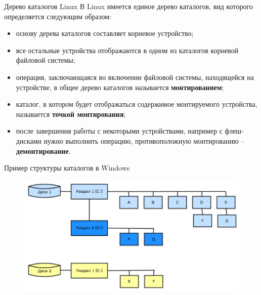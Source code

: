 \documentclass[xcolor=table]{beamer}
\begin{document}
\begin{frame}[fragile]{Дерево каталогов Linux}
	В Linux имеется единое дерево каталогов, вид которого определяется следующим образом:
	\begin{itemize}
		\item основу дерева каталогов составляет корневое устройство;
		\item все остальные устройства отображаются в одном из каталогов корневой файловой системы;
		\item операция, заключающаяся во включении файловой системы, находящейся на устройстве, в общее дерево каталогов называется \textbf{монтированием};
		\item каталог, в котором будет отображаться содержимое монтируемого устройства, называется \textbf{точкой
монтирования}; 
		\item после завершения работы с некоторыми устройствами, например с флеш-дисками нужно выполнить операцию, противоположную монтированию – \textbf{демонтирование}.
	\end{itemize}
\end{frame}

\begin{frame}[fragile]{Пример структуры каталогов в Windows}
	\begin{figure}[h]
		\centering
		\includegraphics[scale=0.5]{images/lec09-pic01.png}
	\end{figure}
\end{frame}
\end{document}
